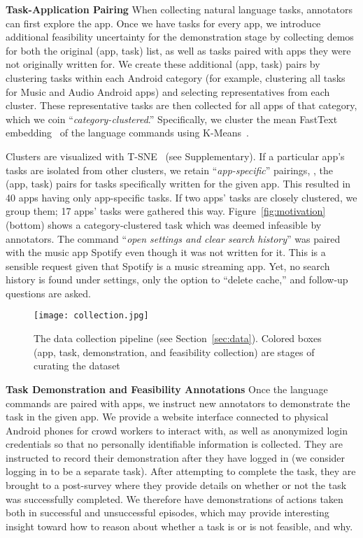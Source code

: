 \noindent\textbf{Task-Application Pairing}
\label{pair}
When collecting natural language tasks, annotators can first explore the app. Once we have tasks for every app, we introduce additional feasibility uncertainty for the demonstration stage by collecting demos for both the original (app, task) list, as well as tasks paired with apps they were not originally written for.  
We create these additional (app, task) pairs by clustering tasks within each Android category (for example, clustering all tasks for Music and Audio Android apps) and selecting representatives from each cluster. These representative tasks are then collected for all apps of that category, which we coin ``\textit{category-clustered}.'' Specifically, we cluster the mean FastText embedding~\cite{conneau2017word} of the language commands using K-Means~\cite{kmeans}.

Clusters are visualized with T-SNE~\cite{vanDerMaaten2008} (see Supplementary). If a particular app's tasks are isolated from other clusters, we retain ``\textit{app-specific}'' pairings, \ie, the (app, task) pairs for tasks specifically written for the given app. This resulted in 40 apps having only app-specific tasks. If two apps' tasks are closely clustered, we group them; 
 17 apps' tasks were gathered this way. 
Figure~\ref{fig:motivation} (bottom) shows a category-clustered task which was deemed infeasible by annotators. The command ``\textit{open settings and clear search history}'' was paired with the music app Spotify even though it was not written for it. This is a sensible request given that Spotify is a music streaming app. Yet, no search history is found under settings, only the option to ``delete cache,'' and follow-up questions are asked.

\begin{figure}[t]
    \centering
    {\texttt{[image: collection.jpg]}
        \caption{The data collection pipeline (see Section~\ref{sec:data}). Colored boxes (app, task, demonstration, and feasibility collection) are stages of curating the dataset}
    \label{fig:collection}
    }
\end{figure}
\label{sec:analysis}

\smallskip

\noindent\textbf{Task Demonstration and Feasibility Annotations}
\label{demofeasanns}
Once the language commands are paired with apps, we instruct new annotators to demonstrate the task in the given app. We provide a website interface connected to physical Android phones for crowd workers to interact with, as well as anonymized login credentials so that no personally identifiable information is collected. They are instructed to record their demonstration after they have logged in (we consider logging in to be a separate task). After attempting to complete the task, they are brought to a post-survey where they provide details on whether or not the task was successfully completed. We therefore have demonstrations of actions taken both in successful and unsuccessful episodes, which may provide interesting insight toward how to reason about whether a task is or is not feasible, and why.

